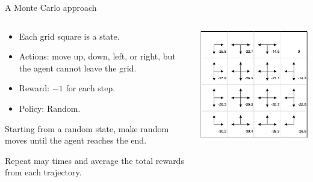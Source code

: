 \documentclass[9pt]{beamer}
\begin{document}
\begin{frame}{A Monte Carlo approach}

\begin{columns}
\begin{column}{0.5\textwidth}
	\begin{itemize}
		\item Each grid square is a state.
		\item Actions: move up, down, left, or right, but the agent cannot leave the grid.
		\item Reward: $-1$ for each step.
		\item Policy: Random.
	\end{itemize}
	
\bigskip
Starting from a random state, make random moves until the agent reaches the end.

\bigskip
Repeat may times and average the total rewards from each trajectory.
\end{column}

\begin{column}{0.5\textwidth}
	\begin{center}
		\includegraphics[width=\textwidth]{figures/gridworld1a.png}	
	\end{center}
\end{column}

\end{columns}

\end{frame}
\end{document}
